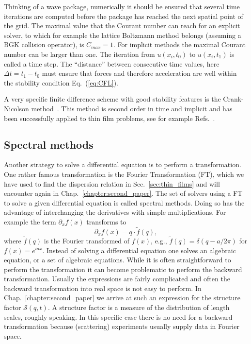 Thinking of a wave package, numerically it should be ensured that several time iterations are computed before the package has reached the next spatial point of the grid.
The maximal value that the Courant number can reach for an explicit solver, to which for example the lattice Boltzmann method belongs (assuming a BGK collision operator), is $C_{max} = 1$.
For implicit methods the maximal Courant number can be larger than one.
The iteration from $u(x_i,t_0)$ to $u(x_i,t_1)$ is called a time step. 
The ``distance'' between consecutive time values, here $\Delta t = t_1 - t_0$ must ensure that forces and therefore acceleration are well within the stability condition Eq.~(\ref{eq:CFL}).

A very specific finite difference scheme with good stability features is the Crank-Nicolson method~\cite{crankPracticalMethodNumerical1947, pressNumericalRecipes3rd2007}.
This method is second order in time and implicit and has been successfully applied to thin film problems, see for example Refs.~\cite{diezGlobalModelsMoving2000, diezMetallicthinfilmInstabilitySpatially2016, munchDewettingRatesThin2005}.

\subsection{Spectral methods}
Another strategy to solve a differential equation is to perform a transformation.
One rather famous transformation is the Fourier Transformation (FT), which we have used to find the dispersion relation in Sec.~\ref{sec:thin_films} and will encounter again in Chap.~\ref{chapter:second_paper}.
The set of solvers using a FT to solve a given differential equation is called spectral methods.
Doing so has the advantage of interchanging the derivatives with simple multiplications.
For example the term $\partial_x f(x)$ transforms to  
\begin{equation}\label{eq:fourier_transform}
    \partial_x f(x) = q\cdot \tilde{f}(q),
\end{equation}
where $\tilde{f}(q)$ is the Fourier transformed of $f(x)$, e.g., $\tilde{f}(q) = \delta(q - a/2\pi)$ for $f(x) = e^{iax}$. 
Instead of solving a differential equation one solves an algebraic equation, or a set of algebraic equations.
While it is often straightforward to perform the transformation it can become problematic to perform the backward transformation. 
Usually the expressions are fairly complicated and often the backward transformation into real space is not easy to perform.
In Chap.~\ref{chapter:second_paper} we arrive at such an expression for the structure factor $\mathcal{S}(q, t)$.
A structure factor is a measure of the distribution of length scales, roughly speaking.
In this specific case there is no need for a backward transformation because (scattering) experiments usually supply data in Fourier space.

